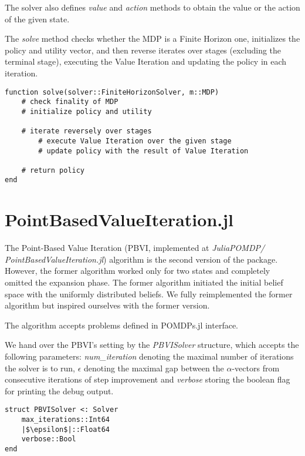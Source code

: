 The solver also defines \textit{value} and \textit{action} methods to obtain the value or the action of the given state.

The \textit{solve} method checks whether the MDP is a Finite Horizon one, initializes the policy and utility vector, and then reverse iterates over stages (excluding the terminal stage), executing the Value Iteration and updating the policy in each iteration.

\begin{samepage}
\begin{verbatim}
function solve(solver::FiniteHorizonSolver, m::MDP)
    # check finality of MDP
    # initialize policy and utility 
    
    # iterate reversely over stages
        # execute Value Iteration over the given stage
        # update policy with the result of Value Iteration

    # return policy
end
\end{verbatim}
\end{samepage}


\section{PointBasedValueIteration.jl}

The Point-Based Value Iteration (PBVI, implemented at \textit{JuliaPOMDP/ PointBasedValueIteration.jl}) algorithm is the second version of the package. However, the former algorithm worked only for two states and completely omitted the expansion phase. The former algorithm initiated the initial belief space with the uniformly distributed beliefs. We fully reimplemented the former algorithm but inspired ourselves with the former version.


The algorithm accepts problems defined in POMDPs.jl interface.

We hand over the PBVI's setting by the \textit{PBVISolver} structure, which accepts the following parameters: \textit{num\_iteration} denoting the maximal number of iterations the solver is to run, \textit{$\epsilon$} denoting the maximal gap between the $\alpha$-vectors from consecutive iterations of step improvement and \textit{verbose} storing the boolean flag for printing the debug output.

\begin{samepage}
\begin{verbatim}
struct PBVISolver <: Solver
    max_iterations::Int64
    |$\epsilon$|::Float64
    verbose::Bool
end
\end{verbatim}
\end{samepage}


